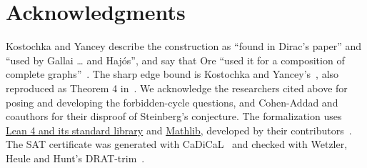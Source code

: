 \documentclass[11pt]{article}
\begin{document}
\section*{Acknowledgments}
Kostochka and Yancey describe the construction as ``found in Dirac's
paper'' and ``used by Gallai \ldots{} and Haj\'os'', and say that Ore
``used it for a composition of complete graphs''~\cite[Section 1]{ky}. The sharp edge bound is
Kostochka and Yancey's~\cite[Theorem 3]{kybound}, also reproduced as
Theorem 4 in~\cite{ky}.
We acknowledge the researchers cited above for posing and developing
the forbidden-cycle questions, and Cohen-Addad and coauthors for their
disproof of Steinberg's conjecture. The formalization uses
\href{https://github.com/leanprover/lean4}{Lean 4 and its standard library}
and \href{https://github.com/leanprover-community/mathlib4}{Mathlib},
developed by their contributors~\cite{leanfour,mathlib}. The SAT certificate was generated with CaDiCaL~\cite{cadical}
and checked with Wetzler, Heule and Hunt's DRAT-trim~\cite{drat}.
\clearpage
\end{document}
